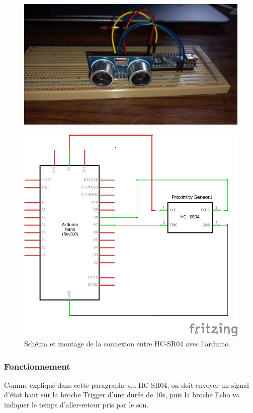 \begin{figure}[!htbp]
    \centering
    \includegraphics[width=.9\linewidth]{assets/HC-SR04/montage.jpg}
\end{figure}

\begin{figure}[!htbp]
    \centering
    \includegraphics[width=.7\linewidth]{assets/HC-SR04/circuit.png}
    \caption{Schéma et montage de la connexion entre HC-SR04 avec l'arduino}
\end{figure}

\FloatBarrier

\subsubsection{Fonctionnement}
Comme expliqué dans cette paragraphe  du HC-SR04, on doit envoyer un signal d'état haut sur la broche Trigger d'une durée de 10\textmu s, puis la broche Echo va indiquer le temps d'aller-retour pris par le son.

